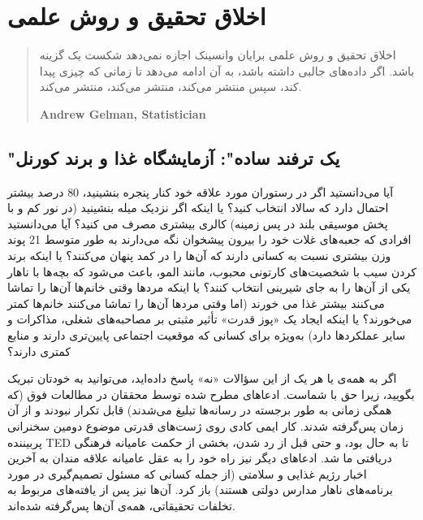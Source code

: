 

\chapter{اخلاق تحقیق و روش علمی}
\label{ch:اخلاق تحقیق و روش علمی}

\begin{quote}
    اخلاق تحقیق و روش علمی برایان وانسینک اجازه نمی‌دهد شکست یک گزینه باشد.
    اگر داده‌های جالبی داشته باشد، به آن ادامه می‌دهد تا زمانی که چیزی پیدا کند، سپس منتشر می‌کند، منتشر می‌کند، منتشر می‌کند.
    \begin{flushleft}
        \textenglish{\textbf{Andrew Gelman, Statistician}}
    \end{flushleft}
\end{quote}

{
\section*{"یک ترفند ساده": آزمایشگاه غذا و برند کورنل}
\label{sec:"یک ترفند ساده": آزمایشگاه غذا و برند کورنل}
آیا می‌دانستید اگر در رستوران مورد علاقه خود کنار پنجره بنشینید، 80 درصد بیشتر احتمال دارد که سالاد انتخاب کنید؟ یا اینکه اگر نزدیک میله بنشینید (در نور کم و با پخش موسیقی بلند در پس زمینه) کالری بیشتری مصرف می کنید؟ آیا می‌دانستید افرادی که جعبه‌های غلات خود را بیرون پیشخوان نگه می‌دارند به طور متوسط 21 پوند وزن بیشتری نسبت به کسانی دارند که آن‌ها را در کمد پنهان می‌کنند؟ یا اینکه برند کردن سیب با شخصیت‌های کارتونی محبوب، مانند المو، باعث می‌شود که بچه‌ها با ناهار یکی از آن‌ها را به جای شیرینی انتخاب کنند؟ یا اینکه مردها وقتی خانم‌ها آن‌ها را تماشا می‌کنند بیشتر غذا می خورند (اما وقتی مردها آن‌ها را تماشا می‌کنند خانم‌ها کمتر می‌خورند؟ یا اینکه ایجاد یک «پوز قدرت» تأثیر مثبتی بر مصاحبه‌های شغلی، مذاکرات و سایر عملکردها دارد) به‌ویژه برای کسانی که موقعیت اجتماعی پایین‌تری دارند و منابع کمتری دارند؟
}

اگر به همه‌ی یا هر یک از این سؤالات «نه» پاسخ داده‌اید، می‌توانید به خودتان تبریک بگویید، زیرا حق با شماست.
ادعاهای مطرح شده توسط محققان در مطالعات فوق (که همگی زمانی به طور برجسته در رسانه‌ها تبلیغ می‌شدند) قابل تکرار نبودند و از آن زمان پس‌گرفته شدند.
کار ایمی کادی روی ژست‌های قدرتی موضوع دومین سخنرانی پربیننده TED تا به حال بود، و حتی قبل از رد شدن، بخشی از حکمت عامیانه فرهنگی دریافتی ما شد.
ادعاهای دیگر نیز راه خود را به عقل عامیانه علاقه مندان به آخرین اخبار رژیم غذایی و سلامتی (از جمله کسانی که مسئول تصمیم‌گیری در مورد برنامه‌های ناهار مدارس دولتی هستند) باز کرد.
آن‌ها نیز پس از یافته‌های مربوط به تخلفات تحقیقاتی، همه‌ی آن‌ها پس‌گرفته شده‌اند.

